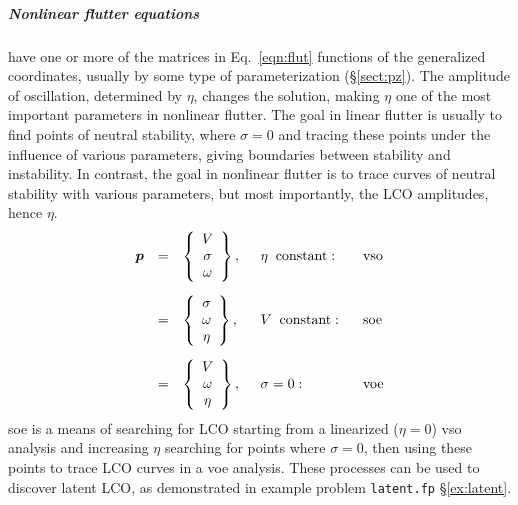 \documentclass[11pt,openany,twoside]{book}
\numberwithin{equation}{section}		%
\newcommand{\Code}[1]{{\small\tt #1}}
\newcommand{\Vector}[1]{\boldsymbol{#1}}
\newcommand{\Sectref}[1]{\S\ref{#1}}
\newcommand{\Eqn}[1]{Eq.\ \ref{#1}}  %
\begin{document}
\subparagraph{Nonlinear flutter equations} have one or more of the matrices in
\Eqn{eqn:flut} functions of the generalized coordinates,
usually by some type of parameterization (\Sectref{sect:pz}).
The amplitude of oscillation, determined by $\eta$, changes the
solution, making $\eta$ one of the most important parameters in nonlinear
flutter.
The goal in linear flutter is usually to find points of neutral
stability, where $\sigma=0$ and tracing these points under the influence
of various parameters, giving boundaries between stability and instability.
In contrast, the goal in nonlinear flutter is to trace curves of
neutral stability with various parameters, but most importantly, the
LCO amplitudes, hence $\eta$.
\begin{equation}
\begin{array}{lclll}
\Vector{p} & = &
	\left\{ \begin{array}{c}
		V \\
		\sigma \\
		\omega
	\end{array}\right\}, \;\; & \eta\;\;\text{constant}: & \hspace{0.1in} \text{vso} \\[0.3in]
	  & = & 
	\left\{ \begin{array}{c}
		\sigma \\
		\omega \\
		\eta
	\end{array}\right\}, \;\; & V\;\;\text{constant}: & \hspace{0.1in} \text{soe} \\[0.3in]
           & = & 
	\left\{ \begin{array}{c}
		V \\
		\omega \\
		\eta
	\end{array}\right\}, \;\; & \sigma = 0: & \hspace{0.1in} \text{voe}
\end{array}
\end{equation}
soe is a means of searching for LCO starting from a
linearized ($\eta = 0$) vso analysis and increasing $\eta$ searching for points
where $\sigma = 0$, then using these points to trace LCO curves in a
voe analysis. These processes can be used to discover
latent LCO, as demonstrated in example problem \Code{latent.fp} \Sectref{ex:latent}.
\end{document}
